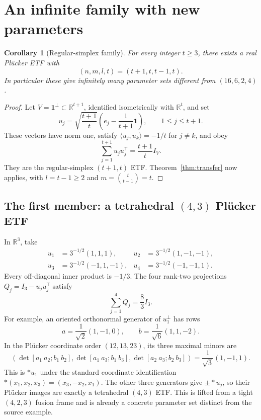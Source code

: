 \documentclass[11pt]{article}
\newtheorem{corollary}[theorem]{Corollary}
\newcommand{\R}{\mathbb R}
\newcommand{\ip}[2]{\langle #1,#2\rangle}
\begin{document}
\section{An infinite family with new parameters}

\begin{corollary}[Regular-simplex family]\label{cor:simplex}
For every integer $t\geq3$, there exists a real Pl\"ucker ETF with
\[
 (n,m,l,t)=(t+1,t,t-1,t).
\]
In particular these give infinitely many parameter sets different from
$(16,6,2,4)$.
\end{corollary}

\begin{proof}
Let $V=\mathbf1^\perp\subset\R^{t+1}$, identified isometrically with
$\R^t$, and set
\[
 u_j=\sqrt{\frac{t+1}{t}}
 \left(e_j-\frac1{t+1}\mathbf1\right),
 \qquad 1\leq j\leq t+1.
\]
These vectors have norm one, satisfy
$\ip{u_j}{u_k}=-1/t$ for $j\ne k$, and obey
\[
 \sum_{j=1}^{t+1}u_ju_j^{\mathsf T}=\frac{t+1}{t}I_V.
\]
They are the regular-simplex $(t+1,t)$ ETF.  Theorem~\ref{thm:transfer}
now applies, with $l=t-1\geq2$ and
$m=\binom{t}{t-1}=t$.
\end{proof}

\subsection*{The first member: a tetrahedral $(4,3)$ Pl\"ucker ETF}

In $\R^3$, take
\[
 \begin{aligned}
 u_1&=3^{-1/2}(1,1,1),&
 u_2&=3^{-1/2}(1,-1,-1),\\
 u_3&=3^{-1/2}(-1,1,-1),&
 u_4&=3^{-1/2}(-1,-1,1).
 \end{aligned}
\]
Every off-diagonal inner product is $-1/3$.  The four rank-two projections
$Q_j=I_3-u_ju_j^{\mathsf T}$ satisfy
\[
 \sum_{j=1}^4Q_j=\frac83 I_3.
\]
For example, an oriented orthonormal generator of $u_1^\perp$ has rows
\[
 a=\frac1{\sqrt2}(1,-1,0),\qquad
 b=\frac1{\sqrt6}(1,1,-2).
\]
In the Pl\"ucker coordinate order $(12,13,23)$, its three maximal minors are
\[
 (\det[a_1\ a_2;b_1\ b_2],
   \det[a_1\ a_3;b_1\ b_3],
   \det[a_2\ a_3;b_2\ b_3])
 =\frac1{\sqrt3}(1,-1,1).
\]
This is $*u_1$ under the standard coordinate identification
$*(x_1,x_2,x_3)=(x_3,-x_2,x_1)$.  The other three generators give
$\pm *u_j$, so their Pl\"ucker images are exactly a tetrahedral $(4,3)$ ETF.
This is lifted from a tight $(4,2,3)$ fusion frame and is already a concrete
parameter set distinct from the source example.
\end{document}
